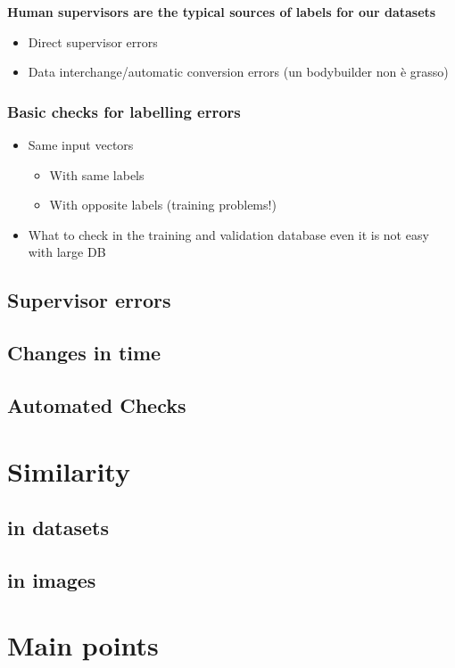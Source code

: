 \noindent \textbf{Human supervisors are the typical sources of labels for our datasets}
\begin{itemize}
    \item Direct supervisor errors
    \item Data interchange/automatic conversion errors (un bodybuilder non è grasso)
\end{itemize}

\subsubsection{Basic checks for labelling errors}
\begin{itemize}
    \item Same input vectors 
    \begin{itemize}
        \item With same labels 
        \item With opposite labels (training problems!)
    \end{itemize}
    \item What to check in the training and validation database even it is not easy with large DB 
\end{itemize}


\subsection{Supervisor errors}


\subsection{Changes in time}


\subsection{Automated Checks}


\section{Similarity }

\subsection{in datasets }

\subsection{in images}

\section{Main points}